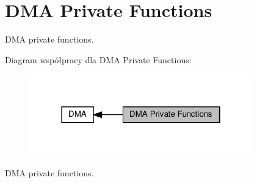 \hypertarget{group___d_m_a___private___functions}{}\section{D\+MA Private Functions}
\label{group___d_m_a___private___functions}


D\+MA private functions.  


Diagram współpracy dla D\+MA Private Functions\+:\nopagebreak
\begin{figure}[H]
\begin{center}
\leavevmode
\includegraphics[width=274pt]{group___d_m_a___private___functions}
\end{center}
\end{figure}
D\+MA private functions. 

